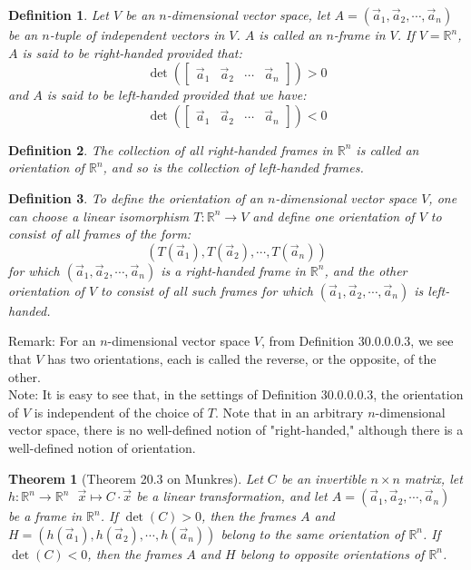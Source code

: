 \documentclass[11pt,oneside]{book}
\theoremstyle{break}
\theoremstyle{break}
\newtheorem{thm}{Theorem}[section]
\newtheorem{defn}{Definition}[corL]
\newcommand{\R}{\mathbb{R}}
\newcommand{\bmat}[1]{\begin{bmatrix} #1 \end{bmatrix}}
\newcommand{\note}{\color{red}Note: \color{black}}
\newcommand{\remark}{\color{blue}Remark: \color{black}}
\begin{document}
\begin{defn}
Let $V$ be an $n$-dimensional vector space, let $A = (\vec{a}_1,\vec{a}_2,\cdots, \vec{a}_n)$ be an $n$-tuple of independent vectors in $V$. $A$ is called an $n$-frame in $V$. If $V = \R^n$, $A$ is said to be right-handed provided that:
$$\det\left(\bmat{\vec{a}_1 & \vec{a}_2 & \cdots & \vec{a}_n}\right) > 0$$ 
and $A$ is said to be left-handed provided that we have: 
$$\det\left(\bmat{\vec{a}_1 & \vec{a}_2 & \cdots & \vec{a}_n}\right) < 0$$
\end{defn}

\begin{defn}
The collection of all right-handed frames in $\R^n$ is called an orientation of $\R^n$, and so is the collection of left-handed frames. 
\end{defn}

\begin{defn}
To define the orientation of an $n$-dimensional vector space $V$, one can choose a linear isomorphism $T:\R^n \to V$ and define one orientation of $V$ to consist of all frames of the form: $$(T(\vec{a}_1), T(\vec{a}_2),\cdots, T(\vec{a}_n))$$ 
for which $(\vec{a}_1,\vec{a}_2,\cdots, \vec{a}_n)$ is a right-handed frame in $\R^n$, and the other orientation of $V$ to consist of all such frames for which $(\vec{a}_1, \vec{a}_2,\cdots, \vec{a}_n)$ is left-handed.
\end{defn}

\remark For an $n$-dimensional vector space $V$, from Definition 30.0.0.0.3, we see that $V$ has two orientations, each is called the reverse, or the opposite, of the other. \\

\note It is easy to see that, in the settings of Definition 30.0.0.0.3, the orientation of $V$ is independent of the choice of $T$. Note that in an arbitrary $n$-dimensional vector space, there is no well-defined notion of "right-handed," although there is a well-defined notion of orientation.

\begin{thm}[Theorem 20.3 on Munkres]
Let $C$ be an invertible $n\times n$ matrix, let $h:\R^n \to \R^n \ \ \ \vec{x}\mapsto C\cdot \vec{x}$ be a linear transformation, and let $A=(\vec{a}_1,\vec{a}_2,\cdots, \vec{a}_n)$ be a frame in $\R^n$. If $\det(C) >0$, then the frames $A$ and $H=(h(\vec{a}_1),h(\vec{a}_2),\cdots, h(\vec{a}_n))$ belong to the same orientation of $\R^n$. If $\det(C)<0$, then the frames $A$ and $H$ belong to opposite orientations of $\R^n$.
\end{thm}
\end{document}
